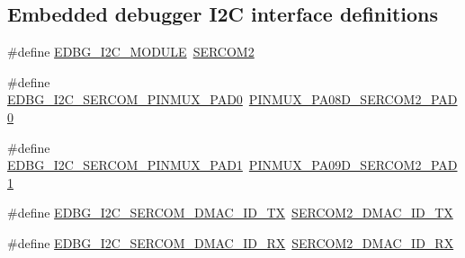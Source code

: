 \subsection*{Embedded debugger I2C interface definitions}
\begin{DoxyCompactItemize}
\item 
\#define \mbox{\hyperlink{group__samd21__xplained__pro__features__group_ga86cb632d58e70b8725d9c8a744cc59d7}{E\+D\+B\+G\+\_\+\+I2\+C\+\_\+\+M\+O\+D\+U\+LE}}~\mbox{\hyperlink{group___s_a_m_d21_j18_a__base_ga918e4c85993961a115bb23b4bb73a87f}{S\+E\+R\+C\+O\+M2}}
\item 
\#define \mbox{\hyperlink{group__samd21__xplained__pro__features__group_gab571585897276d3ae0595dde62399f02}{E\+D\+B\+G\+\_\+\+I2\+C\+\_\+\+S\+E\+R\+C\+O\+M\+\_\+\+P\+I\+N\+M\+U\+X\+\_\+\+P\+A\+D0}}~\mbox{\hyperlink{pio_2samd21j18a_8h_abe10d951128e796cb99f36d5c5489dda}{P\+I\+N\+M\+U\+X\+\_\+\+P\+A08\+D\+\_\+\+S\+E\+R\+C\+O\+M2\+\_\+\+P\+A\+D0}}
\item 
\#define \mbox{\hyperlink{group__samd21__xplained__pro__features__group_ga9a63088aae8523035dfaf614581c4047}{E\+D\+B\+G\+\_\+\+I2\+C\+\_\+\+S\+E\+R\+C\+O\+M\+\_\+\+P\+I\+N\+M\+U\+X\+\_\+\+P\+A\+D1}}~\mbox{\hyperlink{pio_2samd21j18a_8h_adbd76732457e667e3b04123a950bcfc1}{P\+I\+N\+M\+U\+X\+\_\+\+P\+A09\+D\+\_\+\+S\+E\+R\+C\+O\+M2\+\_\+\+P\+A\+D1}}
\item 
\#define \mbox{\hyperlink{group__samd21__xplained__pro__features__group_gafd4f60f265b151b6e5890d78e85aad19}{E\+D\+B\+G\+\_\+\+I2\+C\+\_\+\+S\+E\+R\+C\+O\+M\+\_\+\+D\+M\+A\+C\+\_\+\+I\+D\+\_\+\+TX}}~\mbox{\hyperlink{sercom2_8h_a18e80edc1d1852734d9542e87c7cc485}{S\+E\+R\+C\+O\+M2\+\_\+\+D\+M\+A\+C\+\_\+\+I\+D\+\_\+\+TX}}
\item 
\#define \mbox{\hyperlink{group__samd21__xplained__pro__features__group_ga9829cba8dec19de53bc493217522f63e}{E\+D\+B\+G\+\_\+\+I2\+C\+\_\+\+S\+E\+R\+C\+O\+M\+\_\+\+D\+M\+A\+C\+\_\+\+I\+D\+\_\+\+RX}}~\mbox{\hyperlink{sercom2_8h_adbdd3a084fc9f85a052c316d917e46ac}{S\+E\+R\+C\+O\+M2\+\_\+\+D\+M\+A\+C\+\_\+\+I\+D\+\_\+\+RX}}
\end{DoxyCompactItemize}
